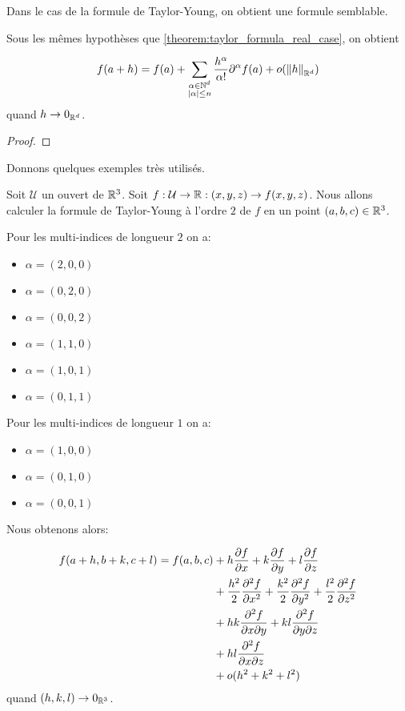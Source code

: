 Dans le cas de la formule de Taylor-Young, on obtient une formule semblable.

\begin{theorem} 
	\label{theorem:taylor_young_formula_real_case}
	Sous les mêmes hypothèses que \ref{theorem:taylor_formula_real_case}, on
	obtient

	\begin{equation*}
		f(a + h) = f(a) + \sum_{\substack{\alpha \in \mathbb{N}^{d} \\
		|\alpha| \leq n}} \frac{h^{\alpha}}{\alpha!}
		\partial^{\alpha}f(a) + o(\norm{h}_{\mathbb{R}^{d}})
	\end{equation*}
	quand $h \rightarrow 0_{\mathbb{R}^{d}}$.
\end{theorem}

\ifdefined\outputproof
\begin{proof}

\end{proof}
\fi

Donnons quelques exemples très utilisés.

\begin{exemple}
	Soit $\mathcal{U}$ un ouvert de $\mathbb{R}^{3}$.
	Soit $f : \mathcal{U} \rightarrow \mathbb{R} : (x, y, z) \rightarrow f(x, y,
	z)$.
	Nous allons calculer la formule de Taylor-Young à l'ordre $2$ de $f$ en un
	point $(a, b, c) \in \mathbb{R}^{3}$.

	Pour les multi-indices de longueur $2$ on a:
	\begin{itemize}
		\item $\alpha = (2, 0, 0)$
		\item $\alpha = (0, 2, 0)$
		\item $\alpha = (0, 0, 2)$
		\item $\alpha = (1, 1, 0)$
		\item $\alpha = (1, 0, 1)$
		\item $\alpha = (0, 1, 1)$
	\end{itemize}

	Pour les multi-indices de longueur $1$ on a:
	\begin{itemize}
		\item $\alpha = (1, 0, 0)$
		\item $\alpha = (0, 1, 0)$
		\item $\alpha = (0, 0, 1)$
	\end{itemize}

	Nous obtenons alors:

	\begin{align*}
		f(a + h, b + k, c + l) = f(a, b, c)
		& + h \pdv{f}{x} (a, b, c) + k \pdv{f}{y} (a, b, c) + l \pdv{f}{z} (a, b,
		c) \\
		& + \frac{h^{2}}{2} \pdv[2]{f}{x} (a, b, c) + \frac{k^{2}}{2}
		\pdv[2]{f}{y} (a, b, c) + \frac{l^{2}}{2} \pdv[2]{f}{z} (a, b, c) \\
		& + hk \pdv{f}{x}{y} (a, b, c)
		+ kl \pdv{f}{y}{z} (a, b, c) \\
		& + hl \pdv{f}{x}{z} (a, b, c) \\
		& + o(h^{2} + k^{2} + l^{2})
	\end{align*}
	quand $(h, k, l) \rightarrow 0_{\mathbb{R}^{3}}$.
\end{exemple}

